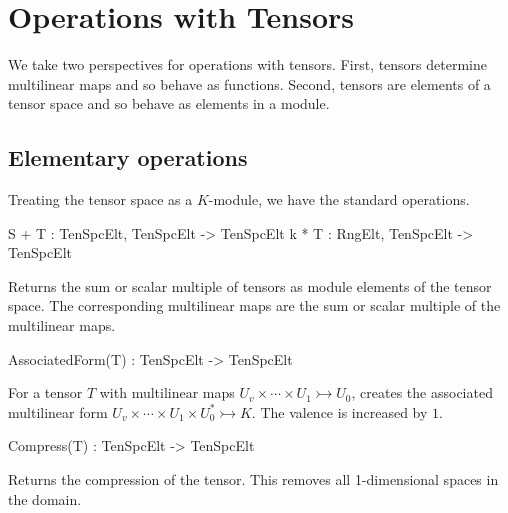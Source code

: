 \section{Operations with Tensors}

We take two perspectives for operations with tensors. 
First, tensors determine multilinear maps and so behave as
functions.  Second, tensors are elements of a tensor space and 
so behave as elements in a module.  

\subsection{Elementary operations}
Treating the tensor space as a $K$-module, we have the standard operations.

\index{$+$}
\begin{intrinsics}
S + T : TenSpcElt, TenSpcElt -> TenSpcElt
k * T : RngElt, TenSpcElt -> TenSpcElt
\end{intrinsics}

Returns the sum or scalar multiple of tensors as module elements of the tensor 
space. The corresponding multilinear maps are the sum or scalar multiple of the 
multilinear maps.



\begin{intrinsics}
AssociatedForm(T) : TenSpcElt -> TenSpcElt
\end{intrinsics}

For a tensor $T$ with multilinear maps $U_v\times \cdots \times U_1\rightarrowtail U_0$,
creates the associated multilinear form
$U_v\times\cdots\times U_1\times U_0^*\rightarrowtail K$.  The valence is increased
by $1$.

\begin{intrinsics}
Compress(T) : TenSpcElt -> TenSpcElt
\end{intrinsics}

Returns the compression of the tensor. This removes all 1-dimensional spaces 
in the domain.

